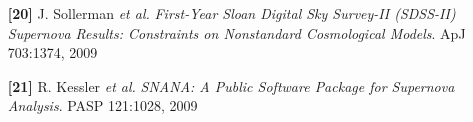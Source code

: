\documentclass{article} %
\def\bf{\bfseries}
\def\sl{\slshape}
\begin{document}
{\begin{itemize}[leftmargin=0ex, itemsep=0ex, parsep=.5ex, labelindent=-4ex]
    \item[{\bf \textcolor{myblue}{[20]}}]
      J. Sollerman {\sl et al.}
      {\it First-Year Sloan Digital Sky Survey-II (SDSS-II) Supernova 
      Results: Constraints on Nonstandard Cosmological Models}.
      ApJ 703:1374, 2009

    \item[{\bf \textcolor{myblue}{[21]}}]
      R. Kessler {\it et al.}
      {\it SNANA: A Public Software Package for Supernova Analysis}.
      PASP 121:1028, 2009

  \end{itemize}
}
\end{document}
